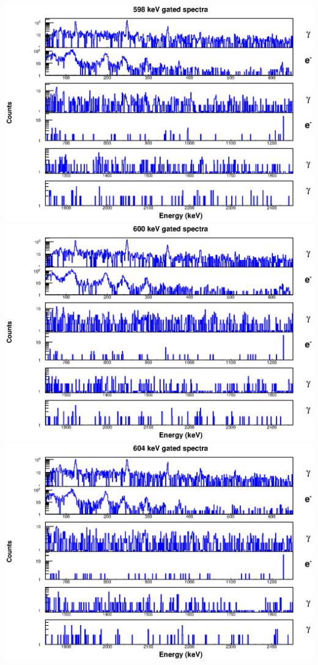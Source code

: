 \includegraphics[scale=0.8]{154Gd_Appendix/598_combined.eps}
\includegraphics[scale=0.8]{154Gd_Appendix/600_combined.eps}
\includegraphics[scale=0.8]{154Gd_Appendix/604_combined.eps}
